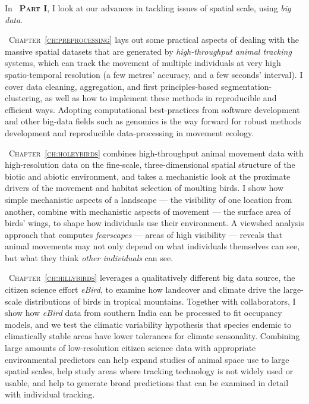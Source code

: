 \medskip

\noindent In {\scshape~\textbf{Part I}}, I look at our advances in tackling issues of spatial scale, using \textit{big data}.

\medskip

{\scshape~Chapter~\ref{ch:preprocessing}} lays out some practical aspects of dealing with the massive spatial datasets that are generated by \textit{high-throughput animal tracking} systems, which can track the movement of multiple individuals at very high spatio-temporal resolution (a few metres' accuracy, and a few seconds' interval).
I cover data cleaning, aggregation, and first principles-based segmentation-clustering, as well as how to implement these methods in reproducible and efficient ways.
Adopting computational best-practices from software development and other big-data fields such as genomics is the way forward for robust methods development and reproducible data-processing in movement ecology.

{\scshape~Chapter~\ref{ch:holeybirds}} combines high-throughput animal movement data with high-resolution data on the fine-scale, three-dimensional spatial structure of the biotic and abiotic environment, and takes a mechanistic look at the proximate drivers of the movement and habitat selection of moulting birds.
I show how simple mechanistic aspects of a landscape --- the visibility of one location from another, combine with mechanistic aspects of movement --- the surface area of birds' wings, to shape how individuals use their environment.
A viewshed analysis approach that computes \textit{fearscapes} --- areas of high visibility --- reveals that animal movements may not only depend on what individuals themselves can see, but what they think \textit{other individuals} can see.

{\scshape~Chapter~\ref{ch:hillybirds}} leverages a qualitatively different big data source, the citizen science effort \textit{eBird}, to examine how landcover and climate drive the large-scale distributions of birds in tropical mountains.
Together with collaborators, I show how \textit{eBird} data from southern India can be processed to fit occupancy models, and we test the climatic variability hypothesis that species endemic to climatically stable areas have lower tolerances for climate seasonality.
Combining large amounts of low-resolution citizen science data with appropriate environmental predictors can help expand studies of animal space use to large spatial scales, help study areas where tracking technology is not widely used or usable, and help to generate broad predictions that can be examined in detail with individual tracking.

